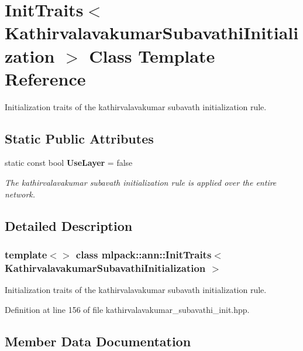 \section{Init\+Traits$<$ Kathirvalavakumar\+Subavathi\+Initialization $>$ Class Template Reference}
\label{classmlpack_1_1ann_1_1InitTraits_3_01KathirvalavakumarSubavathiInitialization_01_4}


Initialization traits of the kathirvalavakumar subavath initialization rule.  


\subsection*{Static Public Attributes}
\begin{DoxyCompactItemize}
\item 
static const bool \textbf{ Use\+Layer} = false
\begin{DoxyCompactList}\small\item\em The kathirvalavakumar subavath initialization rule is applied over the entire network. \end{DoxyCompactList}\end{DoxyCompactItemize}


\subsection{Detailed Description}
\subsubsection*{template$<$$>$\newline
class mlpack\+::ann\+::\+Init\+Traits$<$ Kathirvalavakumar\+Subavathi\+Initialization $>$}

Initialization traits of the kathirvalavakumar subavath initialization rule. 

Definition at line 156 of file kathirvalavakumar\+\_\+subavathi\+\_\+init.\+hpp.



\subsection{Member Data Documentation}
\mbox{\label{classmlpack_1_1ann_1_1InitTraits_3_01KathirvalavakumarSubavathiInitialization_01_4_a6aadf10c95af2a5f0ab17196f682ffd4}} 
